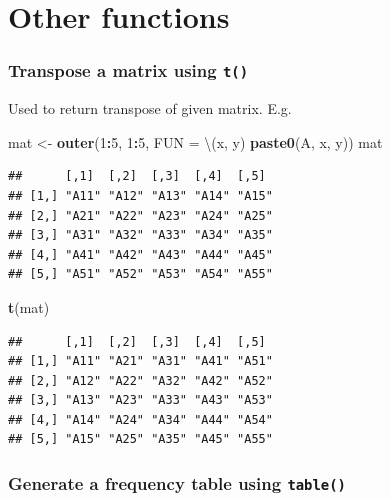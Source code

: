 \documentclass[
]{book}
\newenvironment{Shaded}{\begin{snugshade}}{\end{snugshade}}
\newcommand{\AttributeTok}[1]{\textcolor[rgb]{0.13,0.29,0.53}{#1}}
\newcommand{\DecValTok}[1]{\textcolor[rgb]{0.00,0.00,0.81}{#1}}
\newcommand{\FunctionTok}[1]{\textcolor[rgb]{0.13,0.29,0.53}{\textbf{#1}}}
\newcommand{\NormalTok}[1]{#1}
\newcommand{\OtherTok}[1]{\textcolor[rgb]{0.56,0.35,0.01}{#1}}
\newcommand{\SpecialCharTok}[1]{\textcolor[rgb]{0.81,0.36,0.00}{\textbf{#1}}}
\newcommand{\StringTok}[1]{\textcolor[rgb]{0.31,0.60,0.02}{#1}}
\begin{document}
\hypertarget{other-functions}{%
\section{Other functions}\label{other-functions}}

\hypertarget{transpose-a-matrix-using-t}{%
\subsubsection*{\texorpdfstring{Transpose a matrix using \texttt{t()}}{Transpose a matrix using t()}}\label{transpose-a-matrix-using-t}}

Used to return transpose of given matrix. E.g.

\begin{Shaded}
\begin{Highlighting}[]
\NormalTok{mat }\OtherTok{\textless{}{-}} \FunctionTok{outer}\NormalTok{(}\DecValTok{1}\SpecialCharTok{:}\DecValTok{5}\NormalTok{, }\DecValTok{1}\SpecialCharTok{:}\DecValTok{5}\NormalTok{, }\AttributeTok{FUN =}\NormalTok{ \textbackslash{}(x, y) }\FunctionTok{paste0}\NormalTok{(}\StringTok{\textquotesingle{}A\textquotesingle{}}\NormalTok{, x, y))}
\NormalTok{mat}
\end{Highlighting}
\end{Shaded}

\begin{verbatim}
##      [,1]  [,2]  [,3]  [,4]  [,5] 
## [1,] "A11" "A12" "A13" "A14" "A15"
## [2,] "A21" "A22" "A23" "A24" "A25"
## [3,] "A31" "A32" "A33" "A34" "A35"
## [4,] "A41" "A42" "A43" "A44" "A45"
## [5,] "A51" "A52" "A53" "A54" "A55"
\end{verbatim}

\begin{Shaded}
\begin{Highlighting}[]
\FunctionTok{t}\NormalTok{(mat)}
\end{Highlighting}
\end{Shaded}

\begin{verbatim}
##      [,1]  [,2]  [,3]  [,4]  [,5] 
## [1,] "A11" "A21" "A31" "A41" "A51"
## [2,] "A12" "A22" "A32" "A42" "A52"
## [3,] "A13" "A23" "A33" "A43" "A53"
## [4,] "A14" "A24" "A34" "A44" "A54"
## [5,] "A15" "A25" "A35" "A45" "A55"
\end{verbatim}

\hypertarget{generate-a-frequency-table-using-table}{%
\subsubsection*{\texorpdfstring{Generate a frequency table using \texttt{table()}}{Generate a frequency table using table()}}\label{generate-a-frequency-table-using-table}}
\end{document}
